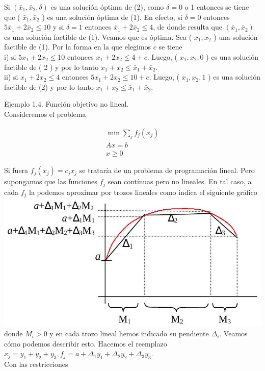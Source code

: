 \documentclass[10pt]{article}
\begin{document}
Si $\left(\bar{x}_{1}, \bar{x}_{2}, \delta\right)$ es una solución óptima de (2), como $\delta=0$ o 1 entonces se tiene que ( $\bar{x}_{1}, \bar{x}_{2}$ ) es una solución óptima de (1). En efecto, si $\delta=0$ entonces $5 \bar{x}_{1}+2 \bar{x}_{2} \leq 10$ y si $\delta=1$ entonces $\bar{x}_{1}+2 \bar{x}_{2} \leq 4$, de donde resulta que $\left(\bar{x}_{1}, \bar{x}_{2}\right)$ es una solución factible de (1). Veamos que es óptima. Sea ( $x_{1}, x_{2}$ ) una solución factible de (1). Por la forma en la que elegimos $c$ se tiene\\
i) si $5 x_{1}+2 x_{2} \leq 10$ entonces $x_{1}+2 x_{2} \leq 4+c$. Luego, ( $x_{1}, x_{2}, 0$ ) es una solución factible de ( 2 ) y por lo tanto $x_{1}+x_{2} \leq \bar{x}_{1}+\bar{x}_{2}$.\\
ii) si $x_{1}+2 x_{2} \leq 4$ entonces $5 x_{1}+2 x_{2} \leq 10+c$. Luego, ( $x_{1}, x_{2}, 1$ ) es una solución factible de (2) y por lo tanto $x_{1}+x_{2} \leq \bar{x}_{1}+\bar{x}_{2}$.

Ejemplo 1.4. Función objetivo no lineal.\\
Consideremos el problema

$$
\begin{gathered}
\min \sum_{j} f_{j}\left(x_{j}\right) \\
A x=b \\
x \geq 0
\end{gathered}
$$

Si fuera $f_{j}\left(x_{j}\right)=c_{j} x_{j}$ se trataría de un problema de programación lineal. Pero supongamos que las funciones $f_{j}$ sean contínuas pero no lineales. En tal caso, a cada $f_{j}$ la podemos aproximar por trozos lineales como indica el siguiente gráfico\\
\includegraphics[max width=\textwidth, center]{2025_09_05_458e5b1ce89abceb5d44g-03}\\
donde $M_{i}>0$ y en cada trozo lineal hemos indicado su pendiente $\Delta_{i}$. Veamos cómo podemos describir esto. Hacemos el reemplazo $x_{j}=y_{1}+y_{2}+y_{3}, f_{j}=a+\Delta_{1} y_{1}+\Delta_{2} y_{2}+\Delta_{3} y_{3}$.\\
Con las restricciones
\end{document}
